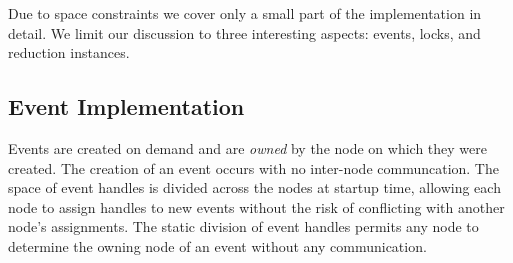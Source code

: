 Due to space constraints we cover only a small part of the implementation in detail.
We limit our discussion to three interesting aspects:
events, locks, and reduction instances.

\subsection{Event Implementation}
\label{subsec:eventimpl}

Events are created on demand and are {\em owned} by the node on which they
were created.  The creation of an event occurs with no inter-node communcation.
The space of event
handles is divided across the nodes at startup time, allowing each node to assign handles
to new events without the risk of conflicting with another node's assignments.  The static division
of event handles permits any node to determine the owning node of an event
without any communication.

